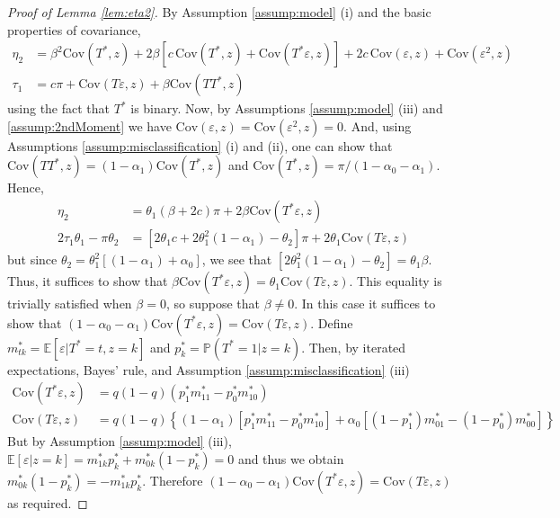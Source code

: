 \begin{proof}[Proof of Lemma \ref{lem:eta2}]
  By Assumption \ref{assump:model} (i) and the basic properties of covariance, 
\begin{align*}
    \eta_2 &= \beta^2 \mbox{Cov}(T^*,z) + 2 \beta\left[ c\, \mbox{Cov}(T^*,z) + \mbox{Cov}(T^*\varepsilon,z)  \right] + 2c \, \mbox{Cov}(\varepsilon,z) + \mbox{Cov}(\varepsilon^2,z)\\
  \tau_1 &= c \pi + \mbox{Cov}(T\varepsilon,z) + \beta \mbox{Cov}(TT^*,z)
\end{align*}
using the fact that $T^*$ is binary. 
Now, by Assumptions \ref{assump:model} (iii) and \ref{assump:2ndMoment} we have $\mbox{Cov}(\varepsilon,z) = \mbox{Cov}(\varepsilon^2,z) = 0$.
And, using Assumptions \ref{assump:misclassification} (i) and (ii), one can show that $\mbox{Cov}(TT^*,z) = (1 - \alpha_1)\mbox{Cov}(T^*,z)$ and $\mbox{Cov}(T^*,z) = \pi/(1 - \alpha_0 - \alpha_1)$.
Hence, 
\begin{align*}
  \eta_2 &= \theta_1\left( \beta 
+ 2 c \right) \pi + 2\beta \mbox{Cov}(T^*\varepsilon,z) \\
  2 \tau_1 \theta_1 - \pi \theta_2 &= \left[2\theta_1 c + 2 \theta_1^2 (1 - \alpha_1) - \theta_2\right]\pi + 2\theta_1 \mbox{Cov}(T\varepsilon,z) 
\end{align*}
but since $\theta_2 = \theta_1^2 \left[ (1 - \alpha_1) + \alpha_0 \right]$, we see that $[2\theta_1^2(1 - \alpha_1) - \theta_2] = \theta_1 \beta$.
Thus, it suffices to show that $\beta \mbox{Cov}(T^*\varepsilon,z) = \theta_1 \mbox{Cov}(T\varepsilon,z)$.
This equality is trivially satisfied when $\beta=0$, so suppose that $\beta \neq 0$. 
In this case it suffices to show that $(1 - \alpha_0 - \alpha_1) \mbox{Cov}(T^*\varepsilon,z) = \mbox{Cov}(T\varepsilon,z)$.
Define $m^*_{tk} = \mathbb{E}\left[ \varepsilon|T^*=t,z=k \right]$ and $p^*_k = \mathbb{P}(T^*=1|z=k)$.
Then, by iterated expectations, Bayes' rule, and Assumption \ref{assump:misclassification} (iii)
\begin{align*}
  \mbox{Cov}(T^*\varepsilon,z) &=q(1 - q)\left(p_1^* m_{11}^*  - p_0^*m_{10}^* \right) \\
  \mbox{Cov}(T\varepsilon,z) &= q(1 - q)\left\{ (1 - \alpha_1)\left[ p_1^* m_{11}^* - p_0^* m_{10}^* \right] + \alpha_0\left[ (1 - p_1^*) m_{01}^* - (1 - p_0^*)m_{00}^* \right] \right\} 
\end{align*}
But by Assumption \ref{assump:model} (iii), $\mathbb{E}[\varepsilon|z=k] = m_{1k}^*p_{k}^* + m_{0k}^*(1 - p_k^*)=0$ and thus we obtain $m_{0k}^*(1 - p_k^*)= - m_{1k}^* p_k^*$.
Therefore  $(1 - \alpha_0 - \alpha_1) \mbox{Cov}(T^*\varepsilon,z) = \mbox{Cov}(T\varepsilon,z)$ as required.
\end{proof}

